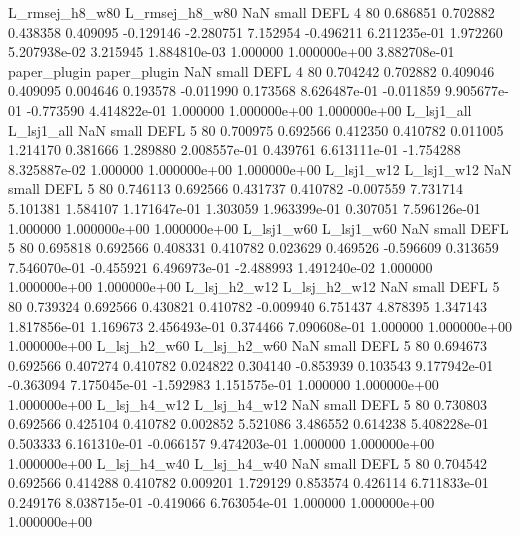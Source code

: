 L_rmsej_h8_w80 L_rmsej_h8_w80                   NaN      small     DEFL                 4 80 0.686851       0.702882 0.438358       0.409095   -0.129146     -2.280751      7.152954    -0.496211   6.211235e-01  1.972260 5.207938e-02     3.215945   1.884810e-03            1.000000    1.000000e+00        3.882708e-01
  paper_plugin   paper_plugin                   NaN      small     DEFL                 4 80 0.704242       0.702882 0.409046       0.409095    0.004646      0.193578     -0.011990     0.173568   8.626487e-01 -0.011859 9.905677e-01    -0.773590   4.414822e-01            1.000000    1.000000e+00        1.000000e+00
    L_lsj1_all     L_lsj1_all                   NaN      small     DEFL                 5 80 0.700975       0.692566 0.412350       0.410782    0.011005      1.214170      0.381666     1.289880   2.008557e-01  0.439761 6.613111e-01    -1.754288   8.325887e-02            1.000000    1.000000e+00        1.000000e+00
    L_lsj1_w12     L_lsj1_w12                   NaN      small     DEFL                 5 80 0.746113       0.692566 0.431737       0.410782   -0.007559      7.731714      5.101381     1.584107   1.171647e-01  1.303059 1.963399e-01     0.307051   7.596126e-01            1.000000    1.000000e+00        1.000000e+00
    L_lsj1_w60     L_lsj1_w60                   NaN      small     DEFL                 5 80 0.695818       0.692566 0.408331       0.410782    0.023629      0.469526     -0.596609     0.313659   7.546070e-01 -0.455921 6.496973e-01    -2.488993   1.491240e-02            1.000000    1.000000e+00        1.000000e+00
  L_lsj_h2_w12   L_lsj_h2_w12                   NaN      small     DEFL                 5 80 0.739324       0.692566 0.430821       0.410782   -0.009940      6.751437      4.878395     1.347143   1.817856e-01  1.169673 2.456493e-01     0.374466   7.090608e-01            1.000000    1.000000e+00        1.000000e+00
  L_lsj_h2_w60   L_lsj_h2_w60                   NaN      small     DEFL                 5 80 0.694673       0.692566 0.407274       0.410782    0.024822      0.304140     -0.853939     0.103543   9.177942e-01 -0.363094 7.175045e-01    -1.592983   1.151575e-01            1.000000    1.000000e+00        1.000000e+00
  L_lsj_h4_w12   L_lsj_h4_w12                   NaN      small     DEFL                 5 80 0.730803       0.692566 0.425104       0.410782    0.002852      5.521086      3.486552     0.614238   5.408228e-01  0.503333 6.161310e-01    -0.066157   9.474203e-01            1.000000    1.000000e+00        1.000000e+00
  L_lsj_h4_w40   L_lsj_h4_w40                   NaN      small     DEFL                 5 80 0.704542       0.692566 0.414288       0.410782    0.009201      1.729129      0.853574     0.426114   6.711833e-01  0.249176 8.038715e-01    -0.419066   6.763054e-01            1.000000    1.000000e+00        1.000000e+00
